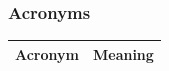 \documentclass{article}
\begin{document}
{        %
        

    \subsubsection{Acronyms}
        \begin{xltabular}{\textwidth}{ >{\raggedright\arraybackslash}c >{\raggedright\arraybackslash}X }
            \hline 
            \textbf{Acronym} & \textbf{Meaning} \\
            \hline 
                

\end{xltabular}}
\end{document}

